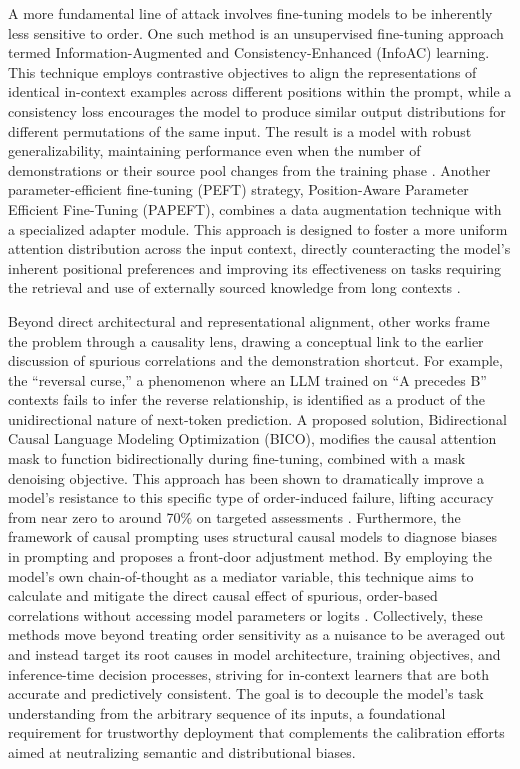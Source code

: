 \documentclass[11pt]{article}
\begin{document}
A more fundamental line of attack involves fine-tuning models to be inherently less sensitive to order. One such method is an unsupervised fine-tuning approach termed Information-Augmented and Consistency-Enhanced (InfoAC) learning. This technique employs contrastive objectives to align the representations of identical in-context examples across different positions within the prompt, while a consistency loss encourages the model to produce similar output distributions for different permutations of the same input. The result is a model with robust generalizability, maintaining performance even when the number of demonstrations or their source pool changes from the training phase \cite{ref180}. Another parameter-efficient fine-tuning (PEFT) strategy, Position-Aware Parameter Efficient Fine-Tuning (PAPEFT), combines a data augmentation technique with a specialized adapter module. This approach is designed to foster a more uniform attention distribution across the input context, directly counteracting the model's inherent positional preferences and improving its effectiveness on tasks requiring the retrieval and use of externally sourced knowledge from long contexts \cite{ref183}.

Beyond direct architectural and representational alignment, other works frame the problem through a causality lens, drawing a conceptual link to the earlier discussion of spurious correlations and the demonstration shortcut. For example, the ``reversal curse,'' a phenomenon where an LLM trained on ``A precedes B'' contexts fails to infer the reverse relationship, is identified as a product of the unidirectional nature of next-token prediction. A proposed solution, Bidirectional Causal Language Modeling Optimization (BICO), modifies the causal attention mask to function bidirectionally during fine-tuning, combined with a mask denoising objective. This approach has been shown to dramatically improve a model's resistance to this specific type of order-induced failure, lifting accuracy from near zero to around 70\% on targeted assessments \cite{ref186}. Furthermore, the framework of causal prompting uses structural causal models to diagnose biases in prompting and proposes a front-door adjustment method. By employing the model's own chain-of-thought as a mediator variable, this technique aims to calculate and mitigate the direct causal effect of spurious, order-based correlations without accessing model parameters or logits \cite{ref187}. Collectively, these methods move beyond treating order sensitivity as a nuisance to be averaged out and instead target its root causes in model architecture, training objectives, and inference-time decision processes, striving for in-context learners that are both accurate and predictively consistent. The goal is to decouple the model's task understanding from the arbitrary sequence of its inputs, a foundational requirement for trustworthy deployment that complements the calibration efforts aimed at neutralizing semantic and distributional biases.
\end{document}
